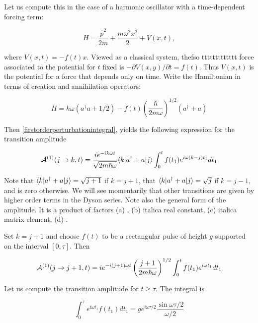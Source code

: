 Let us compute this in the case of a harmonic oscillator with a time-dependent forcing term:

\begin{equation}
H = \frac{\hat p^2}{2m} + \frac{m\omega^2 x^2}{2} + V(x,t),
\end{equation}

where $V(x,t) = -f(t)x$. Viewed as a classical system, thefso ttttttttttttt force associated to the potential for $t$ fixed is
$-\partial V(x,y)/\partial t = f(t)$.  Thus $V(x,t)$ is the potential for a force that depends only on time.  Write the Hamiltonian in terms of creation and annihilation operators:

\begin{equation}
\label{transitionamplitude1}
H = h\omega(a^\dagger a + 1/2) - f(t)\left( \frac{\hbar}{2m\omega}\right)^{1/2} (a^\dagger + a)
\end{equation}

Then \eqref{firstorderperturbationintegral}, yields the following expression for the transition amplitude

\begin{equation}
\mathcal{A}^{(1)}(j \to k, t) = \frac{ie^{-ik\omega t}}{\sqrt{2m\hbar \omega}}\langle k | a^\dagger + a | j \rangle \int_0^t f(t_1)e^{i\omega (k-j) t_1} dt_1
\end{equation}

Note that $\langle k | a^\dagger + a | j \rangle = \sqrt{j+1}$ if $k = j +1$, that $\langle k | a^\dagger + a | j \rangle = \sqrt{j}$ if $k = j -1$, and is zero otherwise. We will see momentarily that other transitions are given by higher order terms in the Dyson series.  Note also the general form of the amplitude. It is a product of factors (a) , (b) italic{a real constant}, (c) italic{a matrix element}, (d) .

Set $k  = j+1$ and choose $f(t)$ to be a rectangular pulse of height $g$ supported on the interval $[0,\tau]$.  Then

\begin{equation}
\mathcal{A}^{(1)}(j \to j+1, t) =ie^{-i(j+1)\omega t} \left(\frac{j+1}{2m\hbar \omega}\right)^{1/2} \int_0^t f(t_1)e^{i\omega  t_1} dt_1
\end{equation}

Let us compute the transition amplitude for  $t \ge \tau$.
The integral is

\begin{equation}
\int_0^\tau e^{i\omega t_1}f(t_1) dt_1 = ge^{i\omega \tau/2}\frac{ \sin \omega \tau/2}{\omega/2}
\end{equation}

